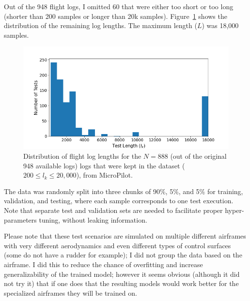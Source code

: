 Out of the 948 flight logs, I omitted 60 that were either too short or too long (shorter than 200 samples or longer than 20k samples). Figure~\ref{fig:test_lengths} shows the distribution of the remaining log lengths. The maximum length ($L$) was 18,000 samples.

\begin{figure}
    \centering
    \includegraphics[width=\columnwidth]{ASE_files/test_lengths.png}
    \caption{Distribution of flight log lengths for the $N=888$ (out of the original 948 available logs) logs that were kept in the dataset ($200 \leq l_k \leq 20,000$), from MicroPilot.}
    \label{fig:test_lengths}
\end{figure}

The data was randomly split into three chunks of 90\%, 5\%, and 5\% for training, validation, and testing, where each sample corresponds to one test execution. Note that separate test and validation sets are needed to facilitate proper hyper-parameters tuning, without leaking information. 

Please note that these test scenarios are simulated on multiple different airframes with very different aerodynamics and even different types of control surfaces (some do not have a rudder for example); I did not group the data based on the airframe. I did this to reduce the chance of overfitting and increase generalizability of the trained model; however it seems obvious (although it did not try it) that if one does that the resulting models would work better for the specialized airframes they will be trained on.

